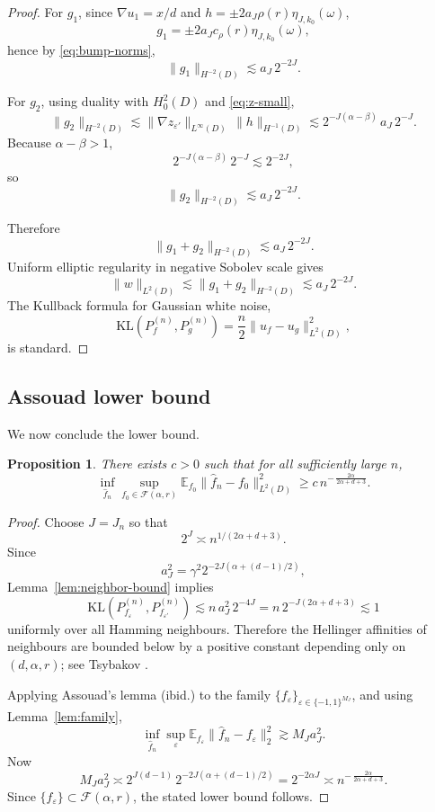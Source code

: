 \documentclass[11pt]{article}
\newtheorem{proposition}[theorem]{Proposition}
\newcommand{\E}{\mathbb E}
\newcommand{\KL}{\mathrm{KL}}
\begin{document}
\begin{proof}
For $g_1$, since $\nabla u_1=x/d$ and $h=\pm 2a_J\rho(r)\eta_{J,k_0}(\omega)$,
\[
g_1=\pm 2a_J c_\rho(r)\eta_{J,k_0}(\omega),
\]
hence by \eqref{eq:bump-norms},
\[
\|g_1\|_{H^{-2}(D)}\lesssim a_J\, 2^{-2J}.
\]

For $g_2$, using duality with $H_0^2(D)$ and \eqref{eq:z-small},
\[
\|g_2\|_{H^{-2}(D)}
\lesssim
\|\nabla z_{\varepsilon'}\|_{L^\infty(D)}\, \|h\|_{H^{-1}(D)}
\lesssim
2^{-J(\alpha-\beta)}\, a_J\, 2^{-J}.
\]
Because $\alpha-\beta>1$,
\[
2^{-J(\alpha-\beta)}\, 2^{-J}\lesssim 2^{-2J},
\]
so
\[
\|g_2\|_{H^{-2}(D)}\lesssim a_J\, 2^{-2J}.
\]

Therefore
\[
\|g_1+g_2\|_{H^{-2}(D)}\lesssim a_J\, 2^{-2J}.
\]
Uniform elliptic regularity in negative Sobolev scale gives
\[
\|w\|_{L^2(D)}
\lesssim
\|g_1+g_2\|_{H^{-2}(D)}
\lesssim
a_J\, 2^{-2J}.
\]
The Kullback formula for Gaussian white noise,
\[
\KL(P_f^{(n)},P_g^{(n)})=\frac n2 \|u_f-u_g\|_{L^2(D)}^2,
\]
is standard.
\end{proof}

\subsection*{Assouad lower bound}

We now conclude the lower bound.

\begin{proposition}\label{prop:lower}
There exists $c>0$ such that for all sufficiently large $n$,
\[
\inf_{\hat f_n}\sup_{f_0\in \mathcal F(\alpha,r)}
\E_{f_0}\|\hat f_n-f_0\|_{L^2(D)}^2
\ge
c\, n^{-\,\frac{2\alpha}{2\alpha+d+3}}.
\]
\end{proposition}

\begin{proof}
Choose $J=J_n$ so that
\[
2^J\asymp n^{1/(2\alpha+d+3)}.
\]
Since
\[
a_J^2
=
\gamma^2 2^{-2J(\alpha+(d-1)/2)},
\]
Lemma~\ref{lem:neighbor-bound} implies
\[
\KL(P_{f_\varepsilon}^{(n)},P_{f_{\varepsilon'}}^{(n)})
\lesssim
n\, a_J^2\, 2^{-4J}
=
n\, 2^{-J(2\alpha+d+3)}
\lesssim 1
\]
uniformly over all Hamming neighbours. Therefore the Hellinger affinities of neighbours are bounded below by a positive constant depending only on $(d,\alpha,r)$; see Tsybakov \cite[Sec.~2.7]{Tsybakov}.

Applying Assouad's lemma (ibid.) to the family $\{f_\varepsilon\}_{\varepsilon\in\{-1,1\}^{M_J}}$, and using Lemma~\ref{lem:family},
\[
\inf_{\hat f_n}\sup_{\varepsilon}
\E_{f_\varepsilon}\|\hat f_n-f_\varepsilon\|_2^2
\gtrsim
M_J a_J^2.
\]
Now
\[
M_J a_J^2
\asymp
2^{J(d-1)} \, 2^{-2J(\alpha+(d-1)/2)}
=
2^{-2\alpha J}
\asymp
n^{-\,\frac{2\alpha}{2\alpha+d+3}}.
\]
Since $\{f_\varepsilon\}\subset \mathcal F(\alpha,r)$, the stated lower bound follows.
\end{proof}
\end{document}
